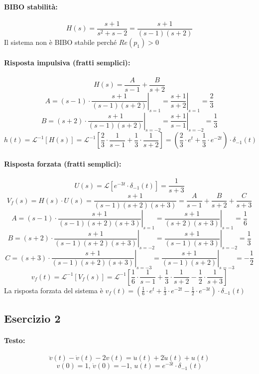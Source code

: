 \documentclass[a4paper,oneside,titlepage]{book}
\begin{document}
\paragraph{BIBO stabilità:}
\[ H(s) = \frac{s + 1}{s^2 + s - 2} = \frac{s + 1}{(s - 1)(s + 2)} \]
Il sistema non è BIBO stabile perché $Re(p_1)>0$

\paragraph{Risposta impulsiva (fratti semplici):}
\[ H(s) = \frac{A}{s - 1} + \frac{B}{s + 2} \]
\[ A = \left. (s-1) \cdot \frac{s + 1}{(s-1)(s+2)} \right|_{s=1} = \left. \frac{s + 1}{s + 2} \right|_{s=1} = \frac{2}{3} \]
\[ B = \left. (s+2) \cdot \frac{s + 1}{(s-1)(s+2)} \right|_{s=-2} = \left. \frac{s + 1}{s - 1} \right|_{s=-2} = \frac{1}{3} \]
\[
h(t) = \mathcal{L}^{-1} [H(s)] = \mathcal{L}^{-1} \left[ \frac{2}{3} \cdot \frac{1}{s - 1} + \frac{1}{3} \cdot \frac{1}{s + 2} \right] = \left( \frac{2}{3} \cdot e^{t} + \frac{1}{3} \cdot e^{-2t} \right) \cdot \delta_{-1}(t)
\]

\paragraph{Risposta forzata (fratti semplici):}
\[ U(s) = \mathcal{L} \left[ e^{-3t} \cdot \delta_{-1}(t) \right] = \frac{1}{s+3} \]
\[ V_f(s) = H(s) \cdot U(s) = \frac{s + 1}{(s - 1)(s + 2)(s + 3)} = \frac{A}{s - 1} + \frac{B}{s + 2} + \frac{C}{s + 3} \]
\[ A = \left. (s-1) \cdot \frac{s+1}{(s-1)(s+2)(s+3)} \right|_{s=1} = \left. \frac{s+1}{(s+2)(s+3)} \right|_{s=1} = \frac{1}{6} \]
\[ B = \left. (s+2) \cdot \frac{s+1}{(s-1)(s+2)(s+3)} \right|_{s=-2} = \left. \frac{s+1}{(s-1)(s+3)} \right|_{s=-2} = \frac{1}{3} \]
\[ C = \left. (s+3) \cdot \frac{s+1}{(s-1)(s+2)(s+3)} \right|_{s=-3} = \left. \frac{s+1}{(s-1)(s+2)} \right|_{s=-3} = - \frac{1}{2} \]
\[
v_f(t) = \mathcal{L}^{-1} [V_f(s)] = \mathcal{L}^{-1} \left[ \frac{1}{6} \cdot \frac{1}{s - 1} + \frac{1}{3} \cdot \frac{1}{s + 2} - \frac{1}{2} \cdot \frac{1}{s + 3} \right]
\]
La risposta forzata del sistema è $v_f(t) = \left( \frac{1}{6} \cdot e^{t} + \frac{1}{3} \cdot e^{-2t} - \frac{1}{2} \cdot e^{-3t} \right) \cdot \delta_{-1}(t)$


\subsection{Esercizio 2}
\paragraph{Testo:}
\[ \ddot{v}(t) - \dot{v}(t)	- 2 v(t) = \ddot{u}(t) + 2 \dot{u}(t) + u(t) \]
\[ v(0) = 1, \, \dot{v}(0) = -1, \, u(t) = e^{-3t} \cdot \delta_{-1}(t) \]
\end{document}
